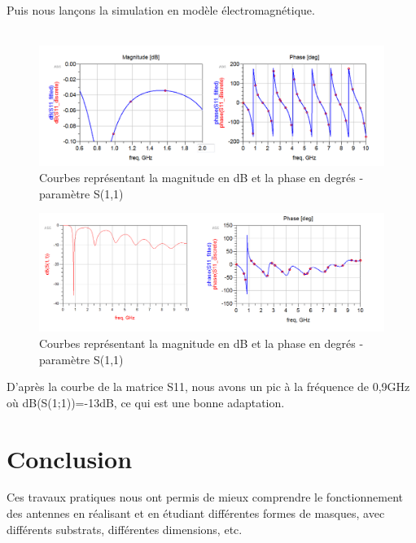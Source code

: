 \documentclass[16pt,a4paper,oneside,titlepage]{report}
\begin{document}
\clearpage
Puis nous lançons la simulation en modèle électromagnétique.\\\\

\begin{figure}[h]
\center
\includegraphics[scale=0.5]{Images/P1_Q2-2.png}
\caption{Courbes représentant la magnitude en dB et la phase en degrés - paramètre S(1,1)}
\end{figure}

\begin{figure}[h]
\center
\includegraphics[scale=0.5]{Images/P1_Q2-3.png}
\caption{Courbes représentant la magnitude en dB et la phase en degrés - paramètre S(1,1)}
\end{figure}

D'après la courbe de la matrice S11, nous avons un pic à la fréquence de 0,9GHz où dB(S(1;1))=-13dB, ce qui est une bonne adaptation. 

\chapter{Conclusion}

Ces travaux pratiques nous ont permis de mieux comprendre le fonctionnement des antennes en réalisant et en étudiant différentes formes de masques, avec différents substrats, différentes dimensions, etc. 
\end{document}
